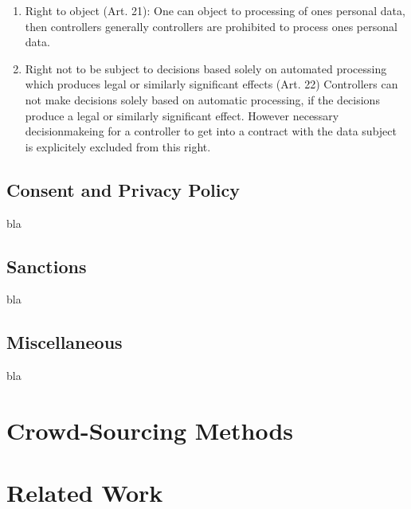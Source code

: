 \documentclass[a4paper,12pt]{report}
\begin{document}
\begin{enumerate}[]
		\item Right to object (Art. 21):
		One can object to processing of ones personal data, then controllers generally controllers are prohibited to process ones personal data.
		\item Right not to be subject to decisions based solely on automated processing which produces legal or similarly significant effects (Art. 22)
		Controllers can not make decisions solely based on automatic processing, if the decisions produce a legal or similarly significant effect. 
		However necessary decisionmakeing for a controller to get into a contract with the data subject is explicitely excluded from this right.
	\end{enumerate}
	\closesection

	\section{Consent and Privacy Policy}
	\startsection
	bla
	\closesection

	\section{Sanctions}
	\startsection
	bla
	\closesection

	\section{Miscellaneous}
	\startsection
	bla
	\closesection
	
	\chapter{Crowd-Sourcing Methods}
	\startsection
	\closesection
	
	\chapter{Related Work \cite{LanierWeylBlueprint}}
	\startsection
	\closesection


	\newpage
	\printbibliography
\end{document}
